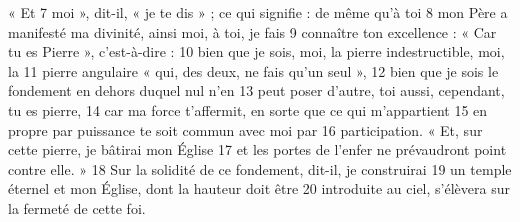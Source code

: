 « Et	 
7	 	moi », dit-il, « je te dis » ; ce qui signifie : de même qu'à toi	 
8	 	mon Père a manifesté ma divinité, ainsi moi, à toi, je fais	 
9	 	connaître ton excellence : « Car tu es Pierre », c'est-à-dire :	 
10	 	bien que je sois, moi, la pierre indestructible, moi, la	 
11	 	pierre angulaire « qui, des deux, ne fais qu'un seul »,	 
12	 	bien que je sois le fondement en dehors duquel nul n'en	 
13	 	peut poser d'autre, toi aussi, cependant, tu es pierre,	 
14	 	car ma force t'affermit, en sorte que ce qui m'appartient	 
15	 	en propre par puissance te soit commun avec moi par	 
16	 	participation. « Et, sur cette pierre, je bâtirai mon Église	 
17	 	et les portes de l'enfer ne prévaudront point contre elle. »	 
18	 	Sur la solidité de ce fondement, dit-il, je construirai	 
19	 	un temple éternel et mon Église, dont la hauteur doit être	 
20	 	introduite au ciel, s'élèvera sur la fermeté de cette foi.